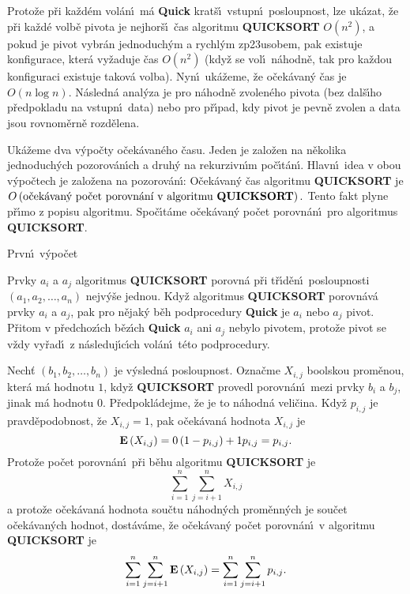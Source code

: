 \flushpar Proto\v ze p\v ri ka\v zd\'em vol\'an\'\i\ m\'a {\bf Quick} krat\v s\'\i\ 
vstupn\'\i\ posloupnost, lze uk\'azat, \v ze p\v ri ka\v zd\'e volb\v e 
pivota je nejhor\v s\'\i\ \v cas algoritmu {\bf QUICKSORT} $O\left(n^2
\right)$, a pokud je pivot vybr\'an jedno\-du\-ch\'ym a rychl\'ym 
zp\accent23usobem, pak exi\-stuje konfigurace, kter\'a vy\v zaduje \v cas $O\left(n^2\right)$
(kdy\v z se vol\'\i\ n\'ahodn\v e, tak pro ka\v zdou konfiguraci existuje takov\'a volba). Nyn\'\i\ 
uk\'a\-\v zeme, \v ze o\v cek\'avan\'y \v cas je $O\left(n\log n\right)$. N\'asledn\'a anal\'y\-za 
je pro n\'a\-hod\-n\v e zvolen\'eho pivota (bez dal\v s\'\i ho p\v redpokladu na 
vstupn\'\i\ data) nebo pro p\v r\'\i pad, kdy pivot je pevn\v e zvolen a data 
jsou rovno\-m\v ern\v e rozd\v e\-lena.
\medskip

\flushpar Uk\'a\v zeme dva v\'ypo\v cty o\v cek\'avan\'eho \v casu.  Jeden 
je zalo\v zen na n\v ekolika jednoduch\'ych pozorov\'an\'\i ch a druh\'y 
na rekurzivn\'\i m po\v c\'\i t\'an\'\i .  Hlavn\'\i\ idea v obou 
v\'ypo\v ctech je zalo\v zena na pozorov\'an\'\i: 
\smallskip
\flushpar O\v cek\'avan\'y \v cas algoritmu {\bf QUICKSORT} je \newline 
$O\left(\text{\rm o\v cek\'avan\'y po\v cet porovn\'an\'\i\ v algoritmu {\bf QUICKSORT}}
\right).$
\smallskip
\flushpar Tento fakt plyne p\v r\'\i mo z popisu algoritmu.  Spo\v c\'\i t\'ame 
o\v cek\'a\-van\'y po\v cet porovn\'an\'\i\ pro algoritmus {\bf QUICKSORT}.  
\medskip

\subhead
Prvn\'\i\ v\'ypo\v cet
\endsubhead
\smallskip

\flushpar Prvky $a_i$ a $a_j$ algoritmus {\bf QUICKSORT} porovn\'a 
p\v ri t\v r\'\i d\v en\'\i\ posloupnosti $\left(a_1,a_2,\dots,a_n\right)$ nejv\'y\v se jednou.  
Kdy\v z algoritmus {\bf QUICKSORT} porovn\'av\'a prvky $a_i$ a $a_
j$, 
pak pro n\v ejak\'y b\v eh podprocedury {\bf Quick} je $a_i$ nebo $
a_j$ 
pivot.  P\v ritom v p\v redchoz\'\i ch b\v ez\'\i ch {\bf Quick} $
a_i$ ani $a_j$ 
nebylo pivotem, proto\v ze pivot se v\v zdy vy\v rad\'\i\ z n\'asleduj\'\i c\'\i ch 
vol\'an\'\i\ t\'eto podprocedury.
\medskip

\flushpar Nech\v t $\left(b_1,b_2,\dots,b_n\right)$ je v\'ysledn\'a posloupnost.  
Ozna\v cme $X_{i,j}$ boolskou prom\v enou, kter\'a m\'a hodnotu $
1$, 
kdy\v z {\bf QUICKSORT} provedl porovn\'an\'\i\ mezi prvky $b_i$ a $
b_j$, 
jinak m\'a hodnotu $0$.  P\v redpokl\'adejme, \v ze je to n\'ahodn\'a 
veli\v cina. Kdy\v z $p_{i,j}$ je prav\-d\v e\-podobnost, \v ze $
X_{i,j}=1$, 
pak o\v cek\'avan\'a hodnota $X_{i,j}$ je 
$$\bold E\left(X_{i,j}\right)=0\left(1-p_{i,j}\right)+1p_{i,j}=p_{i,j}.$$
Proto\v ze po\v cet porovn\'an\'\i\ p\v ri b\v ehu algoritmu {\bf QUICKSORT} je
$$\sum_{i=1}^n\sum_{j=i+1}^nX_{i,j}$$
a proto\v ze o\v cek\'avan\'a hodnota sou\v ctu n\'ahodn\'ych 
prom\v enn\'ych je sou\v cet o\v cek\'avan\'ych hodnot, dost\'av\'ame, \v ze 
o\v cek\'avan\'y po\v cet porovn\'an\'\i\ v algoritmu {\bf QUICKSORT} je
$$\sum_{i=1}^n\sum_{j=i+1}^n\bold E\left(X_{i,j}\right)=\sum_{i=1}^n\sum_{j=
i+1}^np_{i,j}.$$
\medskip

